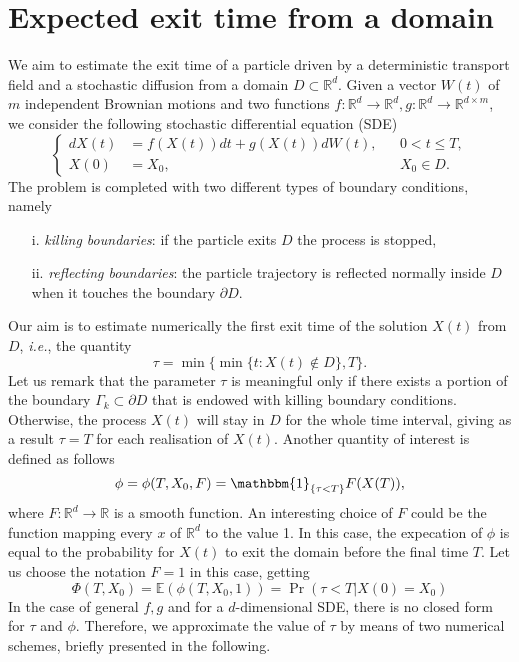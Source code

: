 \section{Expected exit time from a domain}
We aim to estimate the exit time of a particle driven by a deterministic transport field and a stochastic diffusion from a domain $D \subset \mathbb{R}^d$. Given a vector $W(t)$ of $m$ independent Brownian motions and two functions $f\colon \mathbb{R}^d \rightarrow \mathbb{R}^d, g \colon \mathbb{R}^d \rightarrow \mathbb{R}^{d\times m}$, we consider the following stochastic differential equation (SDE)
\begin{equation}\label{eq:GeneralModel}
\left \{
\begin{aligned}
	dX(t) &= f(X(t)) dt + g(X(t))dW(t), && 0 < t \leq T, \\
	X(0)  &= X_0, && X_0 \in D.
\end{aligned} \right .
\end{equation}
The problem is completed with two different types of boundary conditions, namely
\begin{itemize}
	\item[i.]  \textit{killing boundaries}: if the particle exits $D$ the process is stopped,
	\item[ii.] \textit{reflecting boundaries}: the particle trajectory is reflected normally inside $D$ when it touches the boundary $\partial D$.
\end{itemize}
Our aim is to estimate numerically the first exit time of the solution $X(t)$ from $D$, \textit{i.e.}, the quantity
\begin{equation}\label{eq:GeneralTau}
	\tau = \min\{\min\{t\colon X(t)\notin D\},T\}.
\end{equation}
Let us remark that the parameter $\tau$ is meaningful only if there exists a portion of the boundary $\Gamma_k \subset \partial D$ that is endowed with killing boundary conditions. Otherwise, the process $X(t)$ will stay in $D$ for the whole time interval, giving as a result $\tau = T$ for each realisation of $X(t)$. Another quantity of interest is defined as follows
\begin{equation}\label{eq:GeneralPhi}
	\phi = \phi(T,X_0,F) = \mathbbm{1}_{\{\tau<T\}}F(X(T)),
\end{equation}
where $F\colon \mathbb{R}^d \rightarrow \mathbb{R}$ is a smooth function. An interesting choice of $F$ could be the function mapping every $x$ of $\mathbb{R}^d$ to the value 1. In this case, the expecation of $\phi$ is equal to the probability for $X(t)$ to exit the domain before the final time $T$. Let us choose the notation $F = 1$ in this case, getting
\begin{equation}\label{eq:ExitProb}
	\Phi(T,X_0) = \mathbb{E}(\phi(T,X_0,1)) = \Pr(\tau < T | X(0) = X_0)
\end{equation}
In the case of general $f,g$ and for a $d$-dimensional SDE, there is no closed form for $\tau$ and $\phi$. Therefore, we approximate the value of $\tau$ by means of two numerical schemes, briefly presented in the following.





